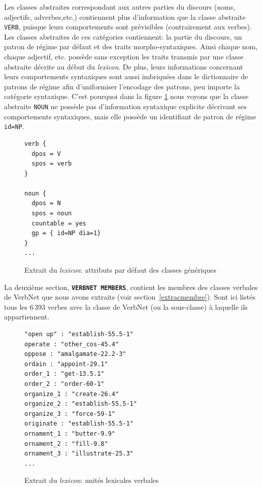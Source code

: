 Les classes abstraites correspondant aux autres parties du discours (noms, adjectifs, adverbes,etc.) contiennent plus d'information que la classe abstraite \texttt{VERB}, puisque leurs comportements sont prévisibles (contrairement aux verbes). Les classes abstraites de ces catégories contiennent: la partie du discours, un patron de régime par défaut et des traits morpho-syntaxiques. Ainsi chaque nom, chaque adjectif, etc. possède sans exception les traits transmis par une classe abstraite décrite au début du \emph{lexicon}. De plus, leurs informations concernant leurs comportements syntaxiques sont aussi imbriquées dans le dictionnaire de patrons de régime afin d'uniformiser l'encodage des patrons, peu importe la catégorie syntaxique. C'est pourquoi dans la figure \ref{classedef} nous voyons que la classe abstraite \texttt{NOUN} ne possède pas d'information syntaxique explicite décrivant ses comportements syntaxiques, mais elle possède un identifiant de patron de régime \texttt{id=NP}.

\begin{figure}[htb]
  \caption{Extrait du \emph{lexicon}: attributs par défaut des classes génériques}
	\label{classedef}
\begin{lstlisting}[language=mate]
verb {
  dpos = V
  spos = verb
}

noun {
  dpos = N
  spos = noun
  countable = yes
  gp = { id=NP dia=1}
}
...
\end{lstlisting}
\end{figure}

La deuxième section, \textbf{\texttt{VERBNET MEMBERS}}, contient les membres des classes verbales de VerbNet que nous avons extraits (voir section~\ref{extracmembre}). Sont ici listés tous les 6\,393 verbes avec la classe de VerbNet (ou la sous-classe) à laquelle ils appartiennent.

\begin{figure}[htb]
  \caption{Extrait du \emph{lexicon}: unités lexicales verbales}
\begin{lstlisting}[language=mate]
"open up" : "establish-55.5-1"
operate : "other_cos-45.4"
oppose : "amalgamate-22.2-3"
ordain : "appoint-29.1"
order_1 : "get-13.5.1"
order_2 : "order-60-1"
organize_1 : "create-26.4"
organize_2 : "establish-55.5-1"
organize_3 : "force-59-1"
originate : "establish-55.5-1"
ornament_1 : "butter-9.9"
ornament_2 : "fill-9.8"
ornament_3 : "illustrate-25.3"
...
\end{lstlisting}
\end{figure}

